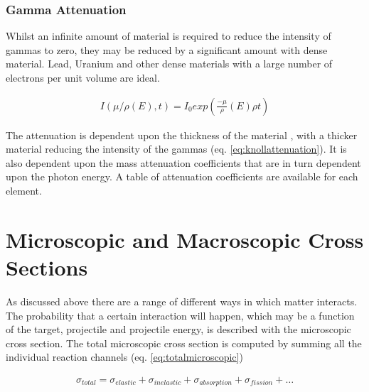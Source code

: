 \subsubsection{Gamma Attenuation}

Whilst an infinite amount of material is required to reduce the intensity of gammas to zero, they may be reduced by a significant amount with dense material.  Lead, Uranium and other dense materials with a large number of electrons per unit volume are ideal.

\begin{equation}
\begin{split}
I(\mu/\rho(E), t) = I_0 exp\left(\frac{-\mu}{\rho}(E) \rho t \right)
\end{split}
\label{eq:knollattenuation}
\end{equation}

The attenuation is dependent upon the thickness of the material , with a thicker material reducing the intensity of the gammas (eq. \ref{eq:knollattenuation}\cite{gknollattenuation}).  It is also dependent upon the mass attenuation coefficients that are in turn dependent upon the photon energy.  A table of attenuation coefficients are available for each element\cite{massattenuation}.



\FloatBarrier






\section{Microscopic and Macroscopic Cross Sections}

As discussed above there are a range of different ways in which matter interacts.  The probability that a certain interaction will happen, which may be a function of the target, projectile and projectile energy, is described with the microscopic cross section.  The total microscopic cross section is computed by summing all the individual reaction channels (eq. \ref{eq:totalmicroscopic})

\begin{equation}
\begin{split}
\sigma_{total} = \sigma_{elastic} + \sigma_{inelastic} + \sigma_{absorption} + \sigma_{fission} + \dots
\end{split}
\label{eq:totalmicroscopic}
\end{equation}

